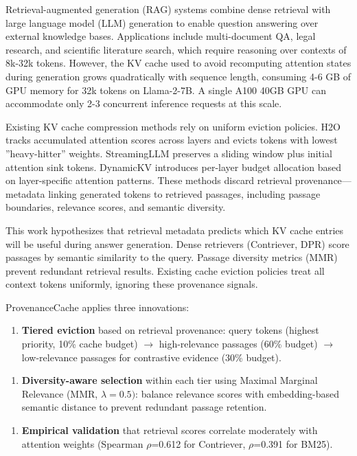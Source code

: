 
Retrieval-augmented generation (RAG) systems combine dense retrieval with large language model (LLM) generation to enable question answering over external knowledge bases. Applications include multi-document QA, legal research, and scientific literature search, which require reasoning over contexts of 8k-32k tokens. However, the KV cache used to avoid recomputing attention states during generation grows quadratically with sequence length, consuming 4-6 GB of GPU memory for 32k tokens on Llama-2-7B. A single A100 40GB GPU can accommodate only 2-3 concurrent inference requests at this scale.

Existing KV cache compression methods rely on uniform eviction policies. H2O tracks accumulated attention scores across layers and evicts tokens with lowest ''heavy-hitter'' weights. StreamingLLM preserves a sliding window plus initial attention sink tokens. DynamicKV introduces per-layer budget allocation based on layer-specific attention patterns. These methods discard retrieval provenance---metadata linking generated tokens to retrieved passages, including passage boundaries, relevance scores, and semantic diversity.

This work hypothesizes that retrieval metadata predicts which KV cache entries will be useful during answer generation. Dense retrievers (Contriever, DPR) score passages by semantic similarity to the query. Passage diversity metrics (MMR) prevent redundant retrieval results. Existing cache eviction policies treat all context tokens uniformly, ignoring these provenance signals.

ProvenanceCache applies three innovations:

\begin{enumerate}
\item \textbf{Tiered eviction} based on retrieval provenance: query tokens (highest priority, 10\% cache budget) $\rightarrow$ high-relevance passages (60\% budget) $\rightarrow$ low-relevance passages for contrastive evidence (30\% budget).
\end{enumerate}

\begin{enumerate}
\item \textbf{Diversity-aware selection} within each tier using Maximal Marginal Relevance (MMR, $\lambda =0.5)$: balance relevance scores with embedding-based semantic distance to prevent redundant passage retention.
\end{enumerate}

\begin{enumerate}
\item \textbf{Empirical validation} that retrieval scores correlate moderately with attention weights (Spearman $\rho$=0.612 for Contriever, $\rho$=0.391 for BM25).
\end{enumerate}

